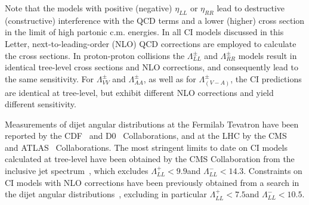 \documentclass[11pt,twoside,a4paper,cmspaper,final,collab]{cms-tdr}
\begin{document}
Note that the models with positive (negative) $\eta_{LL}$ or $\eta_{RR}$ lead to
destructive (constructive) interference with the QCD terms and a lower
(higher) cross section in the limit of high partonic c.m. energies.
In all CI models discussed in this Letter, next-to-leading-order (NLO)  QCD corrections are
employed to calculate the cross sections. In proton-proton collisions the $\Lambda^{\pm}_{LL}$ and
$\Lambda^{\pm}_{RR}$ models result in identical tree-level cross sections and NLO corrections,
and consequently lead to the same sensitivity. For
$\Lambda^{\pm}_{VV}$ and $\Lambda^{\pm}_{AA}$, as well as for
$\Lambda^{\pm}_{(V-A)}$, the CI predictions are
identical at tree-level, but exhibit different NLO corrections and yield different sensitivity.

Measurements of dijet angular distributions at the Fermilab Tevatron have been
reported by the CDF~\cite{Abe:1996mj}
and D0~\cite{Abazov:2009mh,Abbott:2000kp} Collaborations, and at the LHC by the
CMS~\cite{CMS-PAPERS-EXO-11-017,CMS-PAPERS-QCD-10-016,CMS-PAPERS-EXO-10-002}
and ATLAS~\cite{Aad:2012pu,Aad:2011aj} Collaborations.
The most stringent limits to date on CI models calculated at tree-level
have been obtained by the CMS Collaboration
from the inclusive jet \pt spectrum~\cite{CMS-PAPERS-EXO-11-010}, which excludes
$\Lambda^+_{LL} < 9.9$\TeV and $\Lambda^-_{LL} < 14.3$\TeV.
Constraints on CI models with NLO corrections have been previously obtained from a
search in the dijet angular
distributions~\cite{CMS-PAPERS-EXO-11-017}, excluding in particular
$\Lambda^+_{LL} < 7.5$\TeV and $\Lambda^-_{LL} < 10.5$\TeV.
\end{document}
